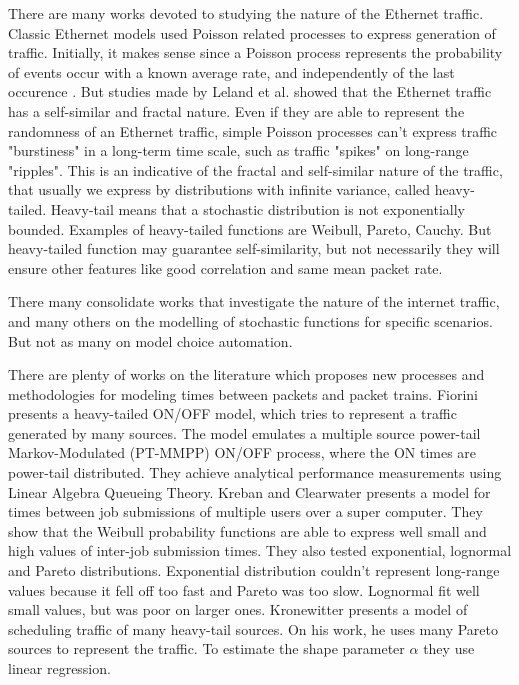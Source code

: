 There are many works devoted to studying the nature of the Ethernet traffic\cite{selfsimilar-ethernet}. Classic Ethernet models used Poisson related processes to express generation of traffic. Initially, it makes sense since a Poisson process represents the probability of events occur with a known average rate, and independently of the last occurence\cite{selfsimilar-ethernet} \cite{book-poisson}. But studies made by Leland et al.\cite{selfsimilar-ethernet} showed that the Ethernet traffic has a self-similar and fractal nature. Even if they are able to represent the randomness of an Ethernet traffic, simple Poisson processes can't express traffic "burstiness" in a long-term time scale, such as traffic "spikes" on long-range "ripples". This is an indicative of the fractal and self-similar nature of the traffic, that usually we express by distributions with infinite variance, called heavy-tailed. Heavy-tail means that a stochastic distribution is not exponentially bounded\cite{sourcesonoff-paper}. Examples of heavy-tailed functions are Weibull, Pareto, Cauchy.  But heavy-tailed function may guarantee self-similarity, but not necessarily they will ensure other features like good correlation and same mean packet rate.

There many consolidate works that investigate the nature of the internet traffic\cite{selfsimilar-ethernet}\cite{analysis-self-similar}\cite{stochartic-selfsimilar}\cite{selfsimilar-highvariability}\cite{multi-player-online-game-self-similarity}, and many others on the modelling of stochastic functions for specific scenarios\cite{estimation-renewal-function-ethernet-traffic}\cite{modelling-of-self-similar}\cite{empirical-interarrival-study}\cite{modeling-concurrent-heavy-tailed}\cite{optimal-scheduling-of-heavy-tailed-traffic}\cite{modelling-of-self-similar}. But not as many on model choice automation\cite{sourcesonoff-paper}.


There are plenty of works on the literature which proposes new processes and methodologies for modeling times between packets and packet trains. Fiorini \cite{modeling-concurrent-heavy-tailed} presents a heavy-tailed ON/OFF model, which tries to represent a traffic generated by many sources. The model emulates a multiple source power-tail Markov-Modulated (PT-MMPP) ON/OFF process, where the ON times are power-tail distributed. They achieve analytical performance measurements using Linear Algebra Queueing Theory. Kreban and Clearwater\cite{hierarchical-dynamics-interarrival-times} presents a model for times between job submissions of multiple users over a super computer. They show that the Weibull probability functions are able to express well small and high values of inter-job submission times. They also tested exponential, lognormal and Pareto distributions. Exponential distribution couldn't  represent long-range values because it fell off too fast and Pareto was too slow. Lognormal fit well small values, but was poor on larger ones. Kronewitter\cite{optimal-scheduling-of-heavy-tailed-traffic} presents a model of scheduling traffic of many heavy-tail sources. On his work, he uses many Pareto sources to represent the traffic. To estimate the shape parameter $\alpha$ they use linear regression.

